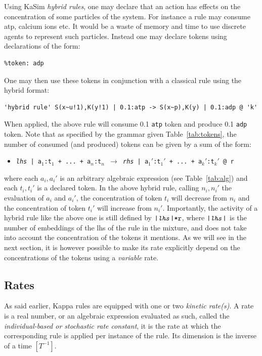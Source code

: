 \documentclass[11pt]{book}
\def\ttt#1{\texttt{#1}}
\def\rar{\rightarrow}
\def\ITE#1{\begin{itemize}#1\end{itemize}}
\def\imp#1{\emph{#1}\index{#1}}
\begin{document}
Using KaSim \imp{hybrid rules}, one may declare that an action has effects on the concentration of some particles of the system. For instance a rule may consume atp, calcium ions etc. It would be a waste of memory and time to use discrete agents to represent such particles. Instead one may declare tokens using declarations of the form:
\begin{lstlisting}[language=kappa]
%token: atp
%token: adp
\end{lstlisting}
One may then use these tokens in conjunction with a classical rule using the hybrid format:
\begin{lstlisting}[language=kappa]
'hybrid rule' S(x~u!1),K(y!1) | 0.1:atp -> S(x~p),K(y) | 0.1:adp @ 'k'
\end{lstlisting}
When applied, the above rule will consume 0.1 \ttt{atp} token and produce 0.1 \ttt{adp} token. Note that as specified by the grammar given Table~\ref{tab:tokens}, the number of consumed (and produced) tokens can be given by a sum of the form:
\ITE{
\item[] \ttt{\textit{lhs} | a$_1$:t$_1$ + ... + a$_n$:t$_n$ $\rar$ \textit{rhs} | a$_1'$:t$_1'$ + ... + a$_k'$:t$_k'$ @ r} 
}
where each $a_i,a_i'$ is an arbitrary algebraic expression (see Table~\ref{tab:alg}) and each $t_i,t_i'$ is a declared token. In the above hybrid rule, calling $n_i,n_i'$  the evaluation of $a_i$ and $a_i'$, the concentration of token $t_i$ will decrease from $n_i$ and the concentration of token $t_i'$ will increase from $n_i'$. Importantly, the activity of a hybrid rule like the above one is still 
defined by $\ttt{|\textit{lhs}|*r}$, where $\ttt{|\textit{lhs}|}$ is the number of embeddings of the lhs of the rule in the mixture, and does not take into account the concentration of the tokens it mentions. As we will see in the next section, it is however possible to make its rate explicitly depend on the concentrations of the tokens using a \imp{variable} rate.

\subsection{Rates}\label{sec:kinetics}
As said earlier, Kappa rules are equipped with one or two \emph{kinetic rate(s)}. A rate is a real number, or an algebraic expression evaluated as such, called the \emph{individual-based or stochastic rate constant}, it is the rate at which the corresponding rule is applied per instance of the rule. Its dimension is the inverse of a time $[T^{-1}]$.
\end{document}
